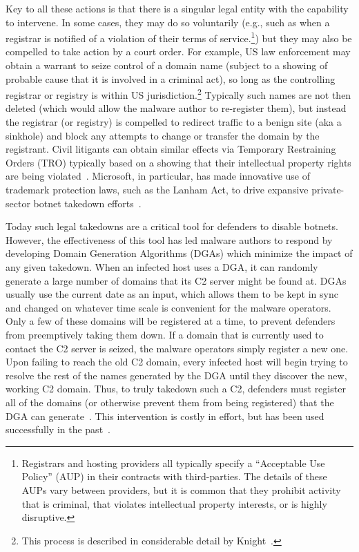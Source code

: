 Key to all these actions is that there is a singular legal entity with
the capability to intervene.  In some cases, they may do so
voluntarily (e.g., such as when a registrar is notified of a violation
of their terms of service.\footnote{Registrars and hosting providers
  all typically specify a ``Acceptable Use Policy'' (AUP) in their
  contracts with third-parties.  The details of these AUPs vary
  between providers, but it is common that they prohibit activity that
  is criminal, that violates intellectual property interests, or is
  highly disruptive.}) but they may also be compelled to take action
by a court order.  For example, US law enforcement may obtain a
warrant to seize control of a domain name (subject to a showing of
probable cause that it is involved in a criminal act), so long as the
controlling registrar or registry is within US
jurisdiction.\footnote{This process is described in considerable
  detail by Knight~\cite{knight_domain_2015}.}  Typically such names
are not then deleted (which would allow the malware author to
re-register them), but instead the registrar (or registry) is
compelled to redirect traffic to a benign site (aka a sinkhole) and
block any attempts to change or transfer the domain by the registrant.
Civil litigants can obtain similar effects via Temporary Restraining
Orders (TRO) typically based on a showing that their intellectual
property rights are being violated~\cite{kesari_deterring_2017}.
Microsoft, in particular, has made innovative use of trademark
protection laws, such as the Lanham Act, to drive expansive
private-sector botnet takedown efforts~\cite{lerner_microsoft_2014}.

Today such legal takedowns are a critical tool for defenders to
disable botnets.  However, the effectiveness of this tool has led
malware authors to respond by developing Domain Generation Algorithms
(DGAs) which minimize the impact of any given takedown. When an
infected host uses a DGA, it can randomly generate a large number of
domains that its C2 server might be found at. DGAs usually use the
current date as an input, which allows them to be kept in sync and
changed on whatever time scale is convenient for the malware
operators. Only a few of these domains will be registered at a time,
to prevent defenders from preemptively taking them down. If a domain
that is currently used to contact the C2 server is seized, the malware
operators simply register a new one. Upon failing to reach the old C2
domain, every infected host will begin trying to resolve the rest of
the names generated by the DGA until they discover the new, working C2
domain. Thus, to truly takedown such a C2, defenders must register all
of the domains (or otherwise prevent them from being registered) that
the DGA can generate~\cite{antonakakis_throw-away_2012}. This
intervention is costly in effort, but has been used successfully in
the past~\cite{confickersomething}.


